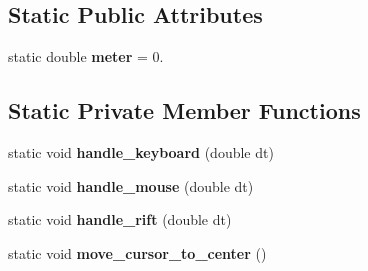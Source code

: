 \subsection*{Static Public Attributes}
\begin{DoxyCompactItemize}
\item 
\hypertarget{class_character_manager_a1da26512c8ff78898d9c2e7a951ef957}{}static double {\bfseries meter} = 0.\label{class_character_manager_a1da26512c8ff78898d9c2e7a951ef957}

\end{DoxyCompactItemize}
\subsection*{Static Private Member Functions}
\begin{DoxyCompactItemize}
\item 
\hypertarget{class_character_manager_a171348c74576e7587c36b54e33826d5e}{}static void {\bfseries handle\+\_\+keyboard} (double dt)\label{class_character_manager_a171348c74576e7587c36b54e33826d5e}

\item 
\hypertarget{class_character_manager_a8818e9135b533a79631bd37c17e22938}{}static void {\bfseries handle\+\_\+mouse} (double dt)\label{class_character_manager_a8818e9135b533a79631bd37c17e22938}

\item 
\hypertarget{class_character_manager_a43f6f617329490410e62c47adbf67f8b}{}static void {\bfseries handle\+\_\+rift} (double dt)\label{class_character_manager_a43f6f617329490410e62c47adbf67f8b}

\item 
\hypertarget{class_character_manager_aa0ffd0ba17eccb1075a9faa3ea4a0d5e}{}static void {\bfseries move\+\_\+cursor\+\_\+to\+\_\+center} ()\label{class_character_manager_aa0ffd0ba17eccb1075a9faa3ea4a0d5e}

\end{DoxyCompactItemize}
